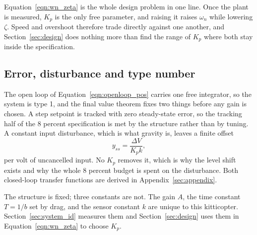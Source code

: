 Equation~\eqref{eqn:wn_zeta} is the whole design problem in one line. Once the plant is
measured, $K_p$ is the only free parameter, and raising it raises $\omega_n$ while lowering
$\zeta$. Speed and overshoot therefore trade directly against one another, and
Section~\ref{sec:design} does nothing more than find the range of $K_p$ where both stay inside
the specification.

\subsection{Error, disturbance and type number}
The open loop of Equation~\eqref{eqn:openloop_pos} carries one free integrator, so the system is
type 1, and the final value theorem fixes two things before any gain is chosen. A step setpoint is
tracked with zero steady-state error, so the tracking half of the $8$ percent specification is met
by the structure rather than by tuning. A constant input disturbance, which is what gravity is,
leaves a finite offset
\begin{equation}\label{eqn:fvt_dist}
    y_{ss} = \frac{\Delta V}{K_p k} ,
\end{equation}
per volt of uncancelled input. No $K_p$ removes it, which is why the level shift exists and why
the whole $8$ percent budget is spent on the disturbance. Both closed-loop transfer functions are
derived in Appendix~\ref{sec:appendix}.

The structure is fixed; three constants are not. The gain $A$, the time constant $T = 1/b$ set by
drag, and the sensor constant $k$ are unique to this kitticopter.
Section~\ref{sec:system_id} measures them and Section~\ref{sec:design} uses them in
Equation~\eqref{eqn:wn_zeta} to choose $K_p$.
